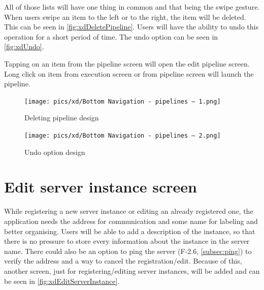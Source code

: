 All of those lists will have one thing in common and that being the swipe gesture.
When users swipe an item to the left or to the right, the item will be deleted.
This can be seen in \autoref{fig:xdDeletePipeline}.
Users will have the ability to undo this operation for a short period of time.
The undo option can be seen in \autoref{fig:xdUndo}.

Tapping on an item from the pipeline screen will open the edit pipeline screen.
Long click on item from execution screen or from pipeline screen will launch the pipeline.

\begin{figure}\centering
    \begin{minipage}[b]{0.32\textwidth}
    	\texttt{[image: pics/xd/Bottom Navigation - pipelines – 1.png]}
    	\caption[Deleting pipeline]{Deleting pipeline design}\label{fig:xdDeletePipeline}
    \end{minipage}
    \begin{minipage}[b]{0.32\textwidth}
    	\texttt{[image: pics/xd/Bottom Navigation - pipelines – 2.png]}
    	\caption[Undo option]{Undo option design}\label{fig:xdUndo}
    \end{minipage}
\end{figure}

\section{Edit server instance screen}
While registering a new server instance or editing an already registered one, the application needs the address for communication and some name for labeling and better organising.
Users will be able to add a description of the instance, so that there is no pressure to store every information about the instance in the server name.
There could also be an option to ping the server (F-2.6, \autoref{subsec:ping}) to verify the address and a way to cancel the registration/edit.
Because of this, another screen, just for registering/editing server instances, will be added and can be seen in \autoref{fig:xdEditServerInstance}.

